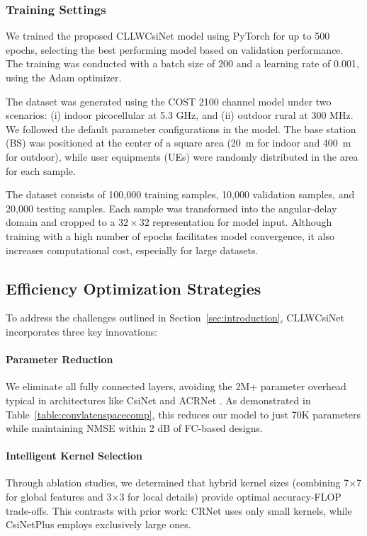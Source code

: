 \documentclass[lettersize,journal]{IEEEtran}
\begin{document}
\subsubsection{Training Settings}

We trained the proposed CLLWCsiNet model using PyTorch for up to 500 epochs, selecting the best performing model based on validation performance. The training was conducted with a batch size of 200 and a learning rate of 0.001, using the Adam optimizer. 

The dataset was generated using the COST 2100 channel model under two scenarios: (i) indoor picocellular at 5.3 GHz, and (ii) outdoor rural at 300 MHz. We followed the default parameter configurations in the model. The base station (BS) was positioned at the center of a square area (20~m for indoor and 400~m for outdoor), while user equipments (UEs) were randomly distributed in the area for each sample. 

The dataset consists of 100{,}000 training samples, 10{,}000 validation samples, and 20{,}000 testing samples. Each sample was transformed into the angular-delay domain and cropped to a $32 \times 32$ representation for model input. Although training with a high number of epochs facilitates model convergence, it also increases computational cost, especially for large datasets.


\subsection{Efficiency Optimization Strategies} \label{subsec:efficiency}
To address the challenges outlined in Section~\ref{sec:introduction}, CLLWCsiNet incorporates three key innovations:

\paragraph{Parameter Reduction} 
We eliminate all fully connected layers, avoiding the 2M+ parameter overhead typical in architectures like CsiNet \cite{abe} and ACRNet \cite{abx}. As demonstrated in Table~\ref{table:convlatenspacecomp}, this reduces our model to just 70K parameters while maintaining NMSE within 2 dB of FC-based designs.

\paragraph{Intelligent Kernel Selection} 
Through ablation studies, we determined that hybrid kernel sizes (combining 7×7 for global features and 3×3 for local details) provide optimal accuracy-FLOP trade-offs. This contrasts with prior work: CRNet \cite{abn} uses only small kernels, while CsiNetPlus \cite{abo} employs exclusively large ones.
\end{document}
